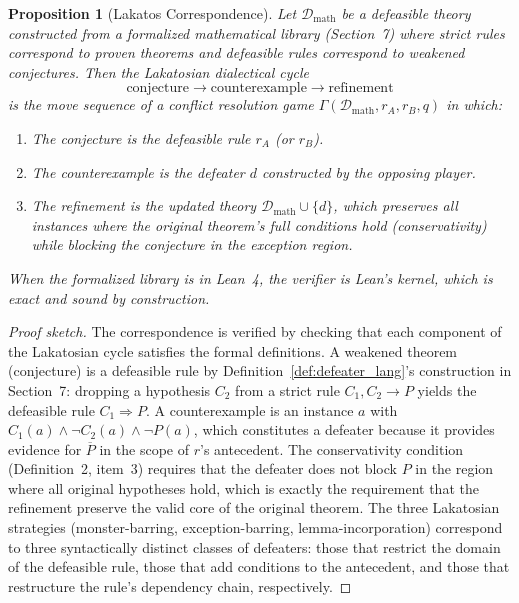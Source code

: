 \documentclass[11pt]{article}
\newtheorem{proposition}{Proposition}
\newcommand{\D}{\mathcal{D}}
\newcommand{\defto}{\Rightarrow}
\newcommand{\strictto}{\rightarrow}
\newcommand{\comp}[1]{\overline{#1}}
\begin{document}
\begin{proposition}[Lakatos Correspondence]\label{prop:lakatos}
Let $\D_{\mathrm{math}}$ be a defeasible theory constructed from a formalized mathematical library (Section~7) where strict rules correspond to proven theorems and defeasible rules correspond to weakened conjectures. Then the Lakatosian dialectical cycle
\[
    \text{conjecture} \longrightarrow \text{counterexample} \longrightarrow \text{refinement}
\]
is the move sequence of a conflict resolution game $\Gamma(\D_{\mathrm{math}}, r_A, r_B, q)$ in which:
\begin{enumerate}[nosep]
    \item The conjecture is the defeasible rule $r_A$ (or $r_B$).
    \item The counterexample is the defeater $d$ constructed by the opposing player.
    \item The refinement is the updated theory $\D_{\mathrm{math}} \cup \{d\}$, which preserves all instances where the original theorem's full conditions hold (conservativity) while blocking the conjecture in the exception region.
\end{enumerate}
When the formalized library is in Lean~4, the verifier is Lean's kernel, which is exact and sound by construction.
\end{proposition}
 
\begin{proof}[Proof sketch]
The correspondence is verified by checking that each component of the Lakatosian cycle satisfies the formal definitions. A weakened theorem (conjecture) is a defeasible rule by Definition~\ref{def:defeater_lang}'s construction in Section~7: dropping a hypothesis $C_2$ from a strict rule $C_1, C_2 \strictto P$ yields the defeasible rule $C_1 \defto P$. A counterexample is an instance $a$ with $C_1(a) \wedge \neg C_2(a) \wedge \neg P(a)$, which constitutes a defeater because it provides evidence for $\comp{P}$ in the scope of $r$'s antecedent. The conservativity condition (Definition~2, item~3) requires that the defeater does not block $P$ in the region where all original hypotheses hold, which is exactly the requirement that the refinement preserve the valid core of the original theorem. The three Lakatosian strategies (monster-barring, exception-barring, lemma-incorporation) correspond to three syntactically distinct classes of defeaters: those that restrict the domain of the defeasible rule, those that add conditions to the antecedent, and those that restructure the rule's dependency chain, respectively.
\end{proof}
\end{document}
